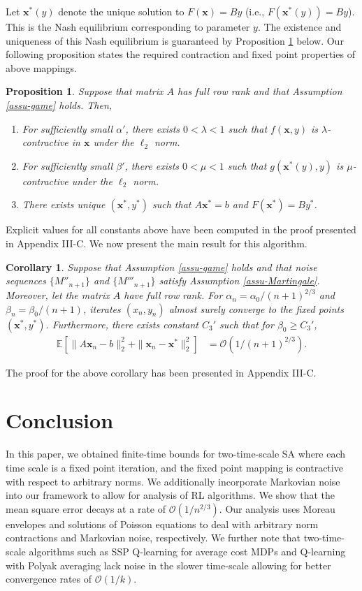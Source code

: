 \documentclass[letterpaper, 10 pt, conference]{ieeeconf}  %
\theoremstyle{definition}
\theoremstyle{plain}
\newtheorem{proposition}{Proposition}
\newtheorem{corollary}{Corollary}
\newcommand{\ystar}{y^*}
\newcommand{\EE}{\mathbb{E}}
\newcommand{\xx}{\mathbf{x}}
\begin{document}
Let $\xx^*(y)$ denote the unique solution to $F(\xx)=By$ (i.e., $F(\xx^*(y))=By$). This is the Nash equilibrium corresponding to parameter $y$. The existence and uniqueness of this Nash equilibrium is guaranteed by Proposition \ref{prop:GNEP} below. Our following proposition states the required contraction and fixed point properties of above mappings.
\begin{proposition}\label{prop:GNEP}
    Suppose that matrix $A$ has full row rank and that Assumption \ref{assu-game} holds. Then,
    \begin{enumerate}[label=\alph*)]
        \item For sufficiently small $\alpha'$, there exists $0<\lambda<1$ such that $f(\xx,y)$ is $\lambda$-contractive in $\xx$ under the $\ell_2$ norm.
        \item For sufficiently small $\beta'$, there exists $0<\mu<1$ such that $g(\xx^*(y),y)$ is $\mu$-contractive under the $\ell_2$ norm.
        \item There exists unique $(\xx^*,\ystar)$ such that $A\xx^*=b$ and $F(\xx^*)=B\ystar$.
    \end{enumerate}
\end{proposition}
Explicit values for all constants above have been computed in the proof presented in Appendix III-C. We now present the main result for this algorithm.

\begin{corollary}\label{coro:GNEP}
Suppose that Assumption \ref{assu-game} holds and that noise sequences $\{M''_{n+1}\}$ and $\{M'''_{n+1}\}$ satisfy Assumption \ref{assu-Martingale}. Moreover, let the matrix $A$ have full row rank. For $\alpha_n=\alpha_0/(n+1)^{2/3}$ and $\beta_n=\beta_{0}/(n+1)$, iterates $(x_n,y_n)$ almost surely converge to the fixed points $(\xx^*,\ystar)$. Furthermore, there exists constant $C_3'$ such that for $\beta_0\geq C_3'$, 
    \begin{align*}
        \EE\left[\|A\xx_n-b\|_2^2+\|\xx_n-\xx^*\|_2^2\right]&=\mathcal{O}\left(1/(n+1)^{2/3}\right).
    \end{align*}
\end{corollary}
The proof for the above corollary has been presented in Appendix III-C.

\section{Conclusion}\label{sec:conc}
In this paper, we obtained finite-time bounds for two-time-scale SA where each time scale is a fixed point iteration, and the fixed point mapping is contractive with respect to arbitrary norms. We additionally incorporate Markovian noise into our framework to allow for analysis of RL algorithms. We show that the mean square error decays at a rate of $\mathcal{O}(1/n^{2/3})$. Our analysis uses Moreau envelopes and solutions of Poisson equations to deal with arbitrary norm contractions and Markovian noise, respectively. We further note that two-time-scale algorithms such as SSP Q-learning for average cost MDPs and Q-learning with Polyak averaging lack noise in the slower time-scale allowing for better convergence rates of $\mathcal{O}(1/k)$. 
\end{document}

